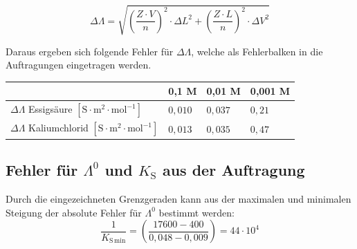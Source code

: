 \documentclass[12pt,a4paper,titlepage,headinclude,bibtotoc]{scrartcl}
\begin{document}



\begin{equation}
\Delta \Lambda = \sqrt{\left(\frac{Z \cdot V}{n}\right)^2 \cdot {\Delta L}^2 + \left(\frac{Z \cdot L}{n}\right)^2 \cdot \Delta V^2}
\end{equation}

Daraus ergeben sich folgende Fehler für $\Delta \Lambda$, welche als Fehlerbalken in die Auftragungen eingetragen werden.\\

\begin{table} [h]
\centering 
\begin{tabular}{|p{7cm}||p{3cm}|p{3cm}|p{3cm}|}
\hline
& 0,1 M & 0,01 M & 0,001 M \\
\hline
$\Delta \Lambda$ Essigsäure $[\mathrm{S \cdot m^{2} \cdot mol^{-1}}]$ & $0,010$ & $0,037$& $0,21$ \\
\hline
$\Delta \Lambda$ Kaliumchlorid $[\mathrm{S \cdot m^{2} \cdot mol^{-1}}]$ &$0,013$ & $0,035$ & $0,47$ \\
\hline
\end{tabular}
\end{table}







\subsection{Fehler für $\Lambda^0$ und $K_{\mathrm{S}}$ aus der Auftragung}

Durch die eingezeichneten Grenzgeraden kann aus der maximalen und minimalen Steigung der absolute Fehler für $\Lambda^0$ bestimmt werden:\\


\begin{equation}
\frac{1}{K_{\mathrm{S}\,\mathrm{min}}} =\left( \frac{17600-400}{0,048-0,009} \right)= 44\cdot 10^4
\end{equation}
\end{document}
